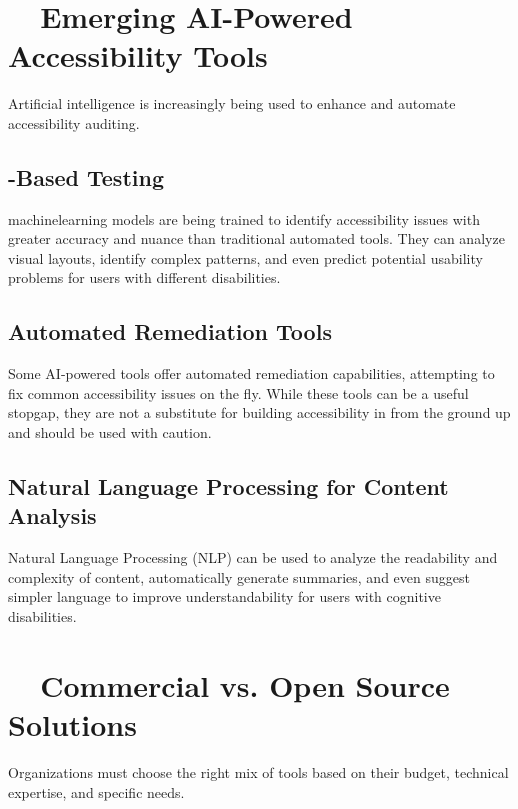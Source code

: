 \section{~~Emerging AI-Powered Accessibility Tools}
\label{sec:ai-tools}
Artificial intelligence is increasingly being used to enhance and automate accessibility auditing.

\subsection{-Based Testing}
\label{subsec:ml-testing}
\gls{machinelearning} models are being trained to identify accessibility issues with greater accuracy and nuance than traditional automated tools. They can analyze visual layouts, identify complex patterns, and even predict potential usability problems for users with different disabilities.
\supercite{Evinced, Stark2024}

\subsection{Automated Remediation Tools}
\label{subsec:automated-remediation}
Some AI-powered tools offer automated remediation capabilities, attempting to fix common accessibility issues on the fly. While these tools can be a useful stopgap, they are not a substitute for building accessibility in from the ground up and should be used with caution.
\supercite{AccessiBe, UserWay2024}

\subsection{Natural Language Processing for Content Analysis}
\label{subsec:nlp-analysis}
Natural Language Processing (NLP) can be used to analyze the readability and complexity of content, automatically generate summaries, and even suggest simpler language to improve understandability for users with cognitive disabilities.
\supercite{Lundgard2022Accessible}

\section{~~Commercial vs. Open Source Solutions}
\label{sec:commercial-vs-open-source}
Organizations must choose the right mix of tools based on their budget, technical expertise, and specific needs.

